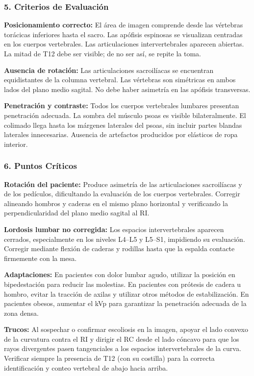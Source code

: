 		\subsubsection*{5. Criterios de Evaluación}
		
		\textbf{Posicionamiento correcto:} El área de imagen comprende desde las vértebras torácicas inferiores hasta el sacro. Las apófisis espinosas se visualizan centradas en los cuerpos vertebrales. Las articulaciones intervertebrales aparecen abiertas. La mitad de T12 debe ser visible; de no ser así, se repite la toma.
		
		\textbf{Ausencia de rotación:} Las articulaciones sacroilíacas se encuentran equidistantes de la columna vertebral. Las vértebras son simétricas en ambos lados del plano medio sagital. No debe haber asimetría en las apófisis transversas.
		
		\textbf{Penetración y contraste:} Todos los cuerpos vertebrales lumbares presentan penetración adecuada. La sombra del músculo psoas es visible bilateralmente. El colimado llega hasta los márgenes laterales del psoas, sin incluir partes blandas laterales innecesarias. Ausencia de artefactos producidos por elásticos de ropa interior.
		
		\subsubsection*{6. Puntos Críticos}
		
		\textbf{Rotación del paciente:} Produce asimetría de las articulaciones sacroilíacas y de los pedículos, dificultando la evaluación de los cuerpos vertebrales. Corregir alineando hombros y caderas en el mismo plano horizontal y verificando la perpendicularidad del plano medio sagital al RI.
		
		\textbf{Lordosis lumbar no corregida:} Los espacios intervertebrales aparecen cerrados, especialmente en los niveles L4--L5 y L5--S1, impidiendo su evaluación. Corregir mediante flexión de caderas y rodillas hasta que la espalda contacte firmemente con la mesa.
		
		\textbf{Adaptaciones:} En pacientes con dolor lumbar agudo, utilizar la posición en bipedestación para reducir las molestias. En pacientes con prótesis de cadera u hombro, evitar la tracción de axilas y utilizar otros métodos de estabilización. En pacientes obesos, aumentar el kVp para garantizar la penetración adecuada de la zona densa.
		
		\textbf{Trucos:} Al sospechar o confirmar escoliosis en la imagen, apoyar el lado convexo de la curvatura contra el RI y dirigir el RC desde el lado cóncavo para que los rayos divergentes pasen tangenciales a los espacios intervertebrales de la curva. Verificar siempre la presencia de T12 (con su costilla) para la correcta identificación y conteo vertebral de abajo hacia arriba.
		
